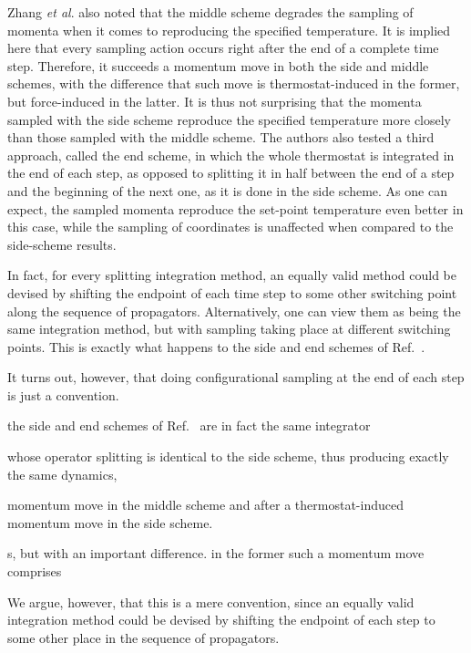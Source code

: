 \documentclass[
    journal=jctcce,
    layout=twocolumn
]{achemso}
\begin{document}
Zhang \textit{et al}. \cite{Zhang_2017} also noted that the middle scheme degrades the sampling of momenta when it comes to reproducing the specified temperature.
It is implied here that every sampling action occurs right after the end of a complete time step.
Therefore, it succeeds a momentum move in both the side and middle schemes, with the difference that such move is thermostat-induced in the former, but force-induced in the latter.
It is thus not surprising that the momenta sampled with the side scheme reproduce the specified temperature more closely than those sampled with the middle scheme.
The authors also tested a third approach, called the end scheme, in which the whole thermostat is integrated in the end of each step, as opposed to splitting it in half between the end of a step and the beginning of the next one, as it is done in the side scheme.
As one can expect, the sampled momenta reproduce the set-point temperature even better in this case, while the sampling of coordinates is unaffected when compared to the side-scheme results. 

In fact, for every splitting integration method, an equally valid method could be devised by shifting the endpoint of each time step to some other switching point along the sequence of propagators.
Alternatively, one can view them as being the same integration method, but with sampling taking place at different switching points.
This is exactly what happens to the side and end schemes of Ref.~.

It turns out, however, that doing configurational sampling at the end of each step is just a convention.



the side and end schemes of Ref.~ are in fact the same integrator




 whose operator splitting is identical to the side scheme, thus producing exactly the same dynamics, 








momentum move in the middle scheme and after a thermostat-induced momentum move in the side scheme.


s, but with an important difference.
in the former such a momentum move comprises 

We argue, however, that this is a mere convention, since an equally valid integration method could be devised by shifting the endpoint of each step to some other place in the sequence of propagators.
\end{document}
